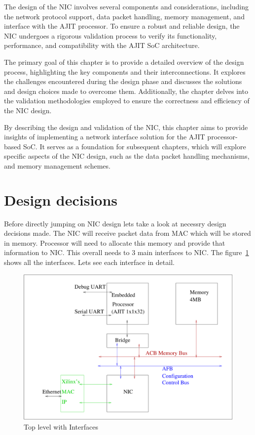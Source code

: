 \documentclass[12pt]{report}
\begin{document}
The design of the NIC involves several components and considerations, including the network protocol support, data packet handling, memory management, and interface with the AJIT processor. To ensure a robust and reliable design, the NIC undergoes a rigorous validation process to verify its functionality, performance, and compatibility with the AJIT SoC architecture.

The primary goal of this chapter is to provide a detailed overview of the design process, highlighting the key components and their interconnections. It explores the challenges encountered during the design phase and discusses the solutions and design choices made to overcome them. Additionally, the chapter delves into the validation methodologies employed to ensure the correctness and efficiency of the NIC design.

By describing the design and validation of the NIC, this chapter aims to provide insights of implementing a network interface solution for the AJIT processor-based SoC. It serves as a foundation for subsequent chapters, which will explore specific aspects of the NIC design, such as the data packet handling mechanisms, and memory management schemes.

	
	\section{Design decisions}
		Before directly jumping on NIC design lets take a look at necessry design decisions made. The NIC will receive packet data from MAC
		which will be stored in memory. Processor will need to allocate this memory and provide that information to NIC. This overall needs to
		3 main interfaces to NIC. The figure~\ref{fig:NIC-Proc-top-level} shows all the interfaces. Lets see each interface in detail.	

		\begin{figure}[h]
			\centering
			\includegraphics[width=12cm]{./figures/top_level_for_interfaces.pdf}
			\caption{Top level with Interfaces}
			\label{fig:NIC-Proc-top-level}
		\end{figure}
\end{document}
